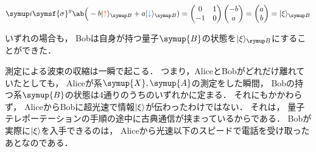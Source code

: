 \documentclass[
]{sotsu}
\newcommand{\bitone}{\mathcolor{fire}{\uparrow}}
\newcommand{\bittwo}{\mathcolor{water}{\downarrow}}
\begin{document}
\begin{enumerate}
        \begin{equation*}
            \iu \symsf{\sigma}^y \ab\Big(-b \ket{\bitone}<B> + a \ket{\bittwo}<B> )
            = \begin{pmatrix}
                0  &  1  \\
                -1 &  0
            \end{pmatrix}
            \begin{pmatrix}
                -b  \\  a
            \end{pmatrix}
            = \begin{pmatrix}
                a  \\  b
            \end{pmatrix}
            = \ket{\xi}<B>
        \end{equation*}
\end{enumerate}
いずれの場合も，
Bobは自身が持つ量子$\symup{B}$の状態を$\ket{\xi}<B>$にすることができた．



\quad 
測定による波束の収縮は一瞬で起こる．
つまり，AliceとBobがどれだけ離れていたとしても，
Aliceが系$\symup{X}, \symup{A}$の測定をした瞬間，
Bobの持つ系$\symup{B}$の状態は4通りのうちのいずれかに定まる．
それにもかかわらず，
AliceからBobに超光速で情報$\ket{\xi}$が伝わったわけではない．
それは，
量子テレポーテーションの手順の途中に古典通信が挟まっているからである．
Bobが実際に$\ket{\xi}$を入手できるのは，
Aliceから光速以下のスピードで電話を受け取ったあとなのである．
\end{document}
